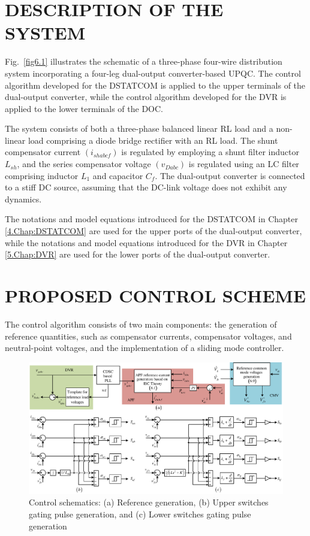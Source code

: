 \section{DESCRIPTION OF THE SYSTEM}
Fig.~\ref{fig6.1} illustrates the schematic of a three-phase four-wire distribution system incorporating a four-leg dual-output converter-based UPQC. The control algorithm developed for the DSTATCOM is applied to the upper terminals of the dual-output converter, while the control algorithm developed for the DVR is applied to the lower terminals of the DOC.

The system consists of both a three-phase balanced linear RL load and a non-linear load comprising a diode bridge rectifier with an RL load. The shunt compensator current $(i_{shabcf})$ is regulated by employing a shunt filter inductor $L_{sh}$, and the series compensator voltage $(v_{Dabc})$ is regulated using an LC filter comprising inductor $L_{1}$ and capacitor $C_{f}$. The dual-output converter is connected to a stiff DC source, assuming that the DC-link voltage does not exhibit any dynamics.

The notations and model equations introduced for the DSTATCOM in Chapter \ref{4.Chap:DSTATCOM} are used for the upper ports of the dual-output converter, while the notations and model equations introduced for the DVR in Chapter \ref{5.Chap:DVR} are used for the lower ports of the dual-output converter.

\section{PROPOSED CONTROL SCHEME}
The control algorithm consists of two main components: the generation of reference quantities, such as compensator currents, compensator voltages, and neutral-point voltages, and the implementation of a sliding mode controller. 
\begin{figure}   
	\centering
	\includegraphics[scale=0.9]{figures/Chapter_6/Mine/Control_Diagram.pdf}
	\caption{Control schematics: (a) Reference generation, (b) Upper switches gating pulse generation, and (c) Lower switches gating pulse generation}
	\label{fig6.3}
\end{figure}


